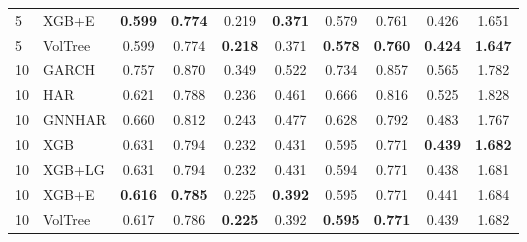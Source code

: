 \documentclass[runningheads]{llncs}
\begin{document}
\begin{table}[t]
\begin{tabular}{ll cccc cccc}
5 & XGB+E    & \textbf{0.599} & \textbf{0.774} & 0.219 & \textbf{0.371} & 0.579 & 0.761 & 0.426 & 1.651 \\ %
5 & VolTree & 0.599 & 0.774 & \textbf{0.218} & 0.371 & \textbf{0.578} & \textbf{0.760} & \textbf{0.424} & \textbf{1.647} \\ %
\midrule
10 & GARCH    & 0.757 & 0.870 & 0.349 & 0.522 & 0.734 & 0.857 & 0.565 & 1.782 \\ %
10 & HAR      & 0.621 & 0.788 & 0.236 & 0.461 & 0.666 & 0.816 & 0.525 & 1.828 \\ %
10 & GNNHAR   & 0.660 & 0.812 & 0.243 & 0.477 & 0.628 & 0.792 & 0.483 & 1.767 \\ %
10 & XGB      & 0.631 & 0.794 & 0.232 & 0.431 & 0.595 & 0.771 & \textbf{0.439} & \textbf{1.682} \\ %
10 & XGB+LG   & 0.631 & 0.794 & 0.232 & 0.431 & 0.594 & 0.771 & 0.438 & 1.681 \\ %
10 & XGB+E    & \textbf{0.616} & \textbf{0.785} & 0.225 & \textbf{0.392} & 0.595 & 0.771 & 0.441 & 1.684 \\ %
10 & VolTree & 0.617 & 0.786 & \textbf{0.225} & 0.392 & \textbf{0.595} & \textbf{0.771} & 0.439 & 1.682 \\ %

\end{tabular}
\end{table}
\end{document}
